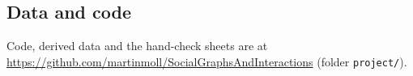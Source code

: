 \documentclass[9pt,twocolumn,twoside]{pnas-new}
\begin{document}
{\subsection*{Data and code}
Code, derived data and the hand-check sheets are at \url{https://github.com/martinmoll/SocialGraphsAndInteractions}
(folder \texttt{project/}).
}

\showmatmethods{}



\clearpage
\end{document}

